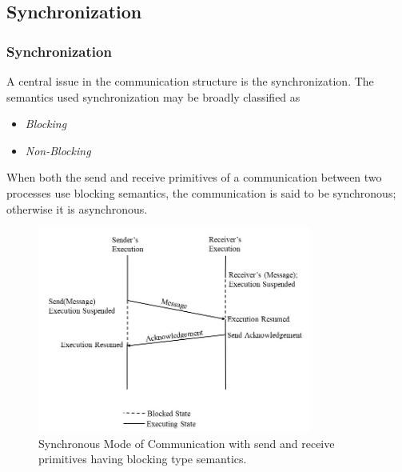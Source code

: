 \documentclass{beamer}
\begin{document}
\subsection{Synchronization}
\begin{frame}[allowframebreaks]
	\frametitle{Synchronization}
	A central issue in the communication structure is the synchronization. The semantics
	used synchronization may be broadly classified as
	\begin{itemize}
		\item \textit{Blocking}
		\item \textit{Non-Blocking}
	\end{itemize}
	When both the send and receive primitives of a communication between two processes use
	blocking semantics, the communication is said to be synchronous; otherwise it is
	asynchronous.
	\vspace{2cm}
	\framebreak
	\begin{figure}
		\centering
		\includegraphics[width=9cm]{synchronousMode.jpg}
		\caption{Synchronous Mode of Communication with send and receive primitives having
		blocking type semantics.}
	\end{figure}
\end{frame}
\end{document}
